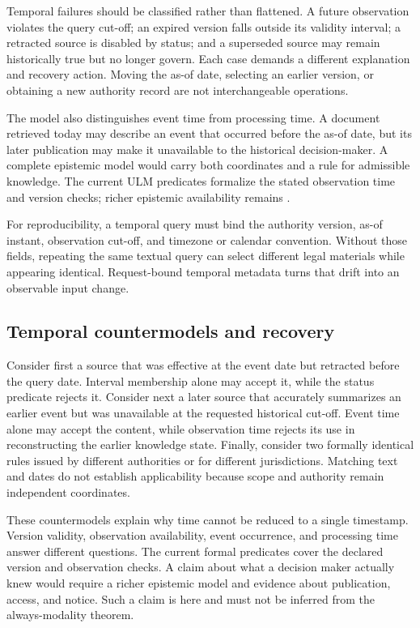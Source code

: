 Temporal failures should be classified rather than flattened. A future observation violates the query cut-off; an expired version falls outside its validity interval; a retracted source is disabled by status; and a superseded source may remain historically true but no longer govern. Each case demands a different explanation and recovery action. Moving the as-of date, selecting an earlier version, or obtaining a new authority record are not interchangeable operations.

The model also distinguishes event time from processing time. A document retrieved today may describe an event that occurred before the as-of date, but its later publication may make it unavailable to the historical decision-maker. A complete epistemic model would carry both coordinates and a rule for admissible knowledge. The current ULM predicates formalize the stated observation time and version checks; richer epistemic availability remains \conjectured{}.

For reproducibility, a temporal query must bind the authority version, as-of instant, observation cut-off, and timezone or calendar convention. Without those fields, repeating the same textual query can select different legal materials while appearing identical. Request-bound temporal metadata turns that drift into an observable input change.

\subsection{Temporal countermodels and recovery}

Consider first a source that was effective at the event date but retracted before the query date. Interval membership alone may accept it, while the status predicate rejects it. Consider next a later source that accurately summarizes an earlier event but was unavailable at the requested historical cut-off. Event time alone may accept the content, while observation time rejects its use in reconstructing the earlier knowledge state. Finally, consider two formally identical rules issued by different authorities or for different jurisdictions. Matching text and dates do not establish applicability because scope and authority remain independent coordinates.

These countermodels explain why time cannot be reduced to a single timestamp. Version validity, observation availability, event occurrence, and processing time answer different questions. The current formal predicates cover the declared version and observation checks. A claim about what a decision maker actually knew would require a richer epistemic model and evidence about publication, access, and notice. Such a claim is \conjectured{} here and must not be inferred from the always-modality theorem.

